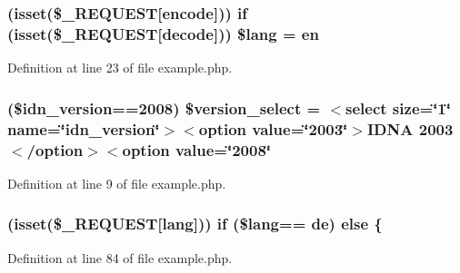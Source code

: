 \subsubsection[{\$lang}]{ (isset(\$\+\_\+\+R\+E\+Q\+U\+E\+S\+T\mbox{[}\textquotesingle{}encode\textquotesingle{}\mbox{]})) {\bf if} (isset(\$\+\_\+\+R\+E\+Q\+U\+E\+S\+T\mbox{[}\textquotesingle{}decode\textquotesingle{}\mbox{]})) \$lang = \textquotesingle{}en\textquotesingle{}}\label{example_8php_aef99014231eb219a8c774eb4b8463fd9}


Definition at line 23 of file example.\+php.

\hypertarget{example_8php_a13d9753a348e3a016c3d8fb1ac173bbd}{}
\subsubsection[{\$version\+\_\+select}]{ (\$idn\+\_\+version==2008) \$version\+\_\+select = \textquotesingle{}$<$select size=\char`\"{}1\char`\"{} name=\char`\"{}idn\+\_\+version\char`\"{}$>$$<$option value=\char`\"{}2003\char`\"{}$>$I\+D\+N\+A 2003$<$/option$>$$<$option value=\char`\"{}2008\char`\"{}\textquotesingle{}}\label{example_8php_a13d9753a348e3a016c3d8fb1ac173bbd}


Definition at line 9 of file example.\+php.

\hypertarget{example_8php_a62bf8b36de1aa08b54e9822dc49899aa}{}
\subsubsection[{else}]{ (isset(\$\+\_\+\+R\+E\+Q\+U\+E\+S\+T\mbox{[}\textquotesingle{}lang\textquotesingle{}\mbox{]})) {\bf if} (\$lang== \textquotesingle{}de\textquotesingle{}) else \{}\label{example_8php_a62bf8b36de1aa08b54e9822dc49899aa}


Definition at line 84 of file example.\+php.

